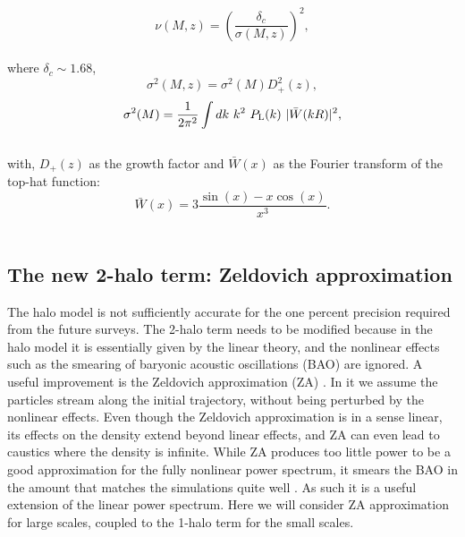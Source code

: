 \documentclass[
  11pt,
  twoside,
  openright,
  titlepage,
  headings=optiontoheadandtoc
]{scrbook}
\begin{document}
\begin{equation}
	\nu(M,z) = \left(\dfrac{\delta_c}{\sigma(M,z)}\right)^2,
\label{p2:nu}
\end{equation}
\\
where $\delta_c \sim 1.68$,
\begin{equation}
	\sigma^2(M,z) = \sigma^2(M)  D^2_+(z),
\end{equation}
\begin{equation}
	\sigma^2(M) =\dfrac{1}{2\pi^2} \int dk\ k^2\ P_{\rm L}(k)\ |\bar{W}(kR)|^2,
\end{equation}
\\
with, $D_+(z)$ as the growth factor and $\bar{W}(x)$ as the Fourier transform of the top-hat function:
\begin{equation}
	\bar{W}(x) = 3 \dfrac{\sin(x) - x\cos(x)}{x^3}.
\end{equation}
\\


\subsection{The new 2-halo term: Zeldovich approximation}\label{p2:sec:zeldovich}

The halo model is not sufficiently accurate for the one percent precision required from the 
future surveys. The 2-halo term needs to be modified because in the halo model 
it is essentially given by the linear theory, and 
the nonlinear effects such as the smearing of baryonic acoustic
oscillations (BAO) are ignored. A useful improvement is the Zeldovich approximation (ZA) \citep{1970A&A.....5...84Z}. 
In it we assume the particles stream along the initial trajectory, without being perturbed by the 
nonlinear effects. Even though the Zeldovich approximation is in a sense linear, its effects on the 
density extend beyond linear effects, and ZA can even lead to caustics where the density is infinite. 
While ZA produces too little power
to be a good approximation for the fully nonlinear power spectrum, it smears the BAO
in the amount that matches the simulations quite well \citep{1993cvf..conf..585T,2008PhRvD..77f3530M}. 
As such it is a useful extension of the linear power spectrum. 
Here we will consider 
ZA approximation for large scales, coupled to the 1-halo term for the small scales. 
\end{document}

